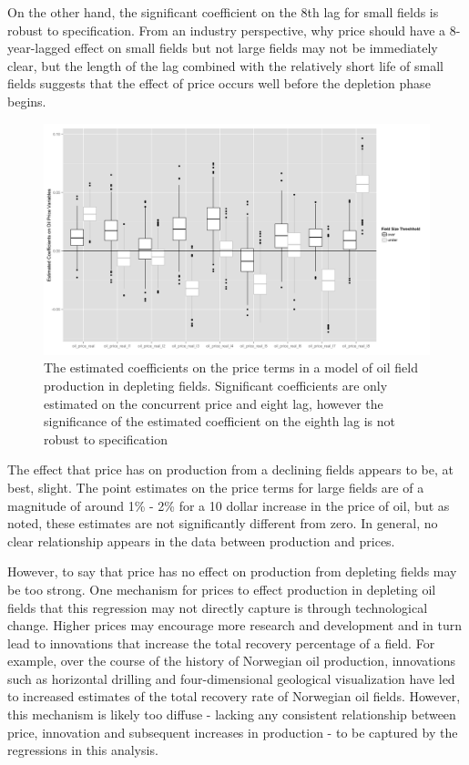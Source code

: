 \documentclass[12pt]{article}
\begin{document}
 On the other hand, the significant coefficient on the 8th lag for small fields is robust to specification. From an industry perspective, why price should have a 8-year-lagged effect on small fields but not large fields may not be immediately clear, but the length of the lag combined with the relatively short life of small fields suggests that the effect of price occurs well before the depletion phase begins.  

\begin{figure}
	\includegraphics[width=1\textwidth]{figures/gam_postpeak_print.png}
	\caption{The estimated coefficients on the price terms in a model of oil field production in depleting fields.  Significant coefficients are only estimated on the concurrent price and eight lag, however the significance of the estimated coefficient on the eighth lag is not robust to specification}
	\label{gam_postpeak_print}
\end{figure}

The effect that price has on production from a declining fields appears to be, at best, slight.  The point estimates on the price terms for large fields are of a magnitude of around 1\% - 2\% for a 10 dollar increase in the price of oil, but as noted, these estimates are not significantly different from zero.  In general, no clear relationship appears in the data between production and prices.

However, to say that price has no effect on production from depleting fields may be too strong. One mechanism for prices to effect production in depleting oil fields that this regression may not directly capture is through technological change.  Higher prices may encourage more research and development and in turn lead to innovations that increase the total recovery percentage of a field.  For example, over the course of the history of Norwegian oil production, innovations such as horizontal drilling and four-dimensional geological visualization have led to increased estimates of the total recovery rate of Norwegian oil fields.  However, this mechanism is likely too diffuse - lacking any consistent relationship between price, innovation and subsequent increases in production - to be captured by the regressions in this analysis. 
\end{document}
